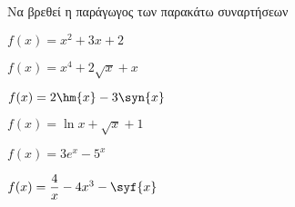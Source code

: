 Να βρεθεί η παράγωγος των παρακάτω συναρτήσεων
\begin{alist}
\item $ f(x)=x^2+3x+2 $
\item $ f(x)=x^4+2\sqrt{x}+x $
\item $ f(x)=2\hm{x}-3\syn{x} $
\item $ f(x)=\ln{x}+\sqrt{x}+1 $
\item $ f(x)=3e^x-5^x $
\item $ f(x)=\dfrac{4}{x}-4x^3-\syf{x} $
\end{alist}
